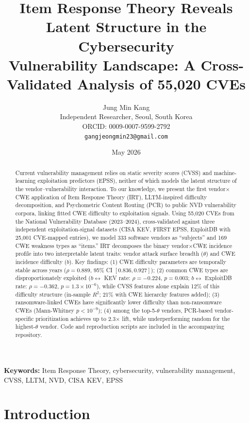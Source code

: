 \documentclass[11pt,a4paper]{article}
\title{Item Response Theory Reveals Latent Structure in the Cybersecurity\\Vulnerability Landscape: A Cross-Validated Analysis of 55,020 CVEs}
\author{Jung Min Kang\\
Independent Researcher, Seoul, South Korea\\
ORCID: 0009-0007-9599-2792\\
\texttt{gangjeongmin23@gmail.com}}
\date{May 2026}
\begin{document}
\sloppy
\maketitle

\begin{abstract}
\noindent
Current vulnerability management relies on static severity scores (CVSS) and machine-learning exploitation predictors (EPSS), neither of which models the latent structure of the vendor--vulnerability interaction.
To our knowledge, we present the first vendor$\times$CWE application of Item Response Theory (IRT), LLTM-inspired difficulty decomposition, and Psychometric Content Routing (PCR) to public NVD vulnerability corpora, linking fitted CWE difficulty to exploitation signals.
Using 55,020 CVEs from the National Vulnerability Database (2023--2024), cross-validated against three independent exploitation-signal datasets (CISA KEV, FIRST EPSS, ExploitDB with 25,001 CVE-mapped entries), we model 333 software vendors as ``subjects'' and 169 CWE weakness types as ``items.''
IRT decomposes the binary vendor$\times$CWE incidence profile into two interpretable latent traits: vendor attack surface breadth ($\theta$) and CWE incidence difficulty ($b$).
Key findings: (1) CWE difficulty parameters are temporally stable across years ($\rho = 0.889$, 95\% CI $[0.836, 0.927]$); (2) common CWE types are disproportionately exploited ($b \leftrightarrow$ KEV rate: $\rho = -0.224$, $p = 0.003$; $b \leftrightarrow$ ExploitDB rate: $\rho = -0.362$, $p = 1.3 \times 10^{-6}$), while CVSS features alone explain 12\% of this difficulty structure (in-sample $R^2$; 21\% with CWE hierarchy features added); (3) ransomware-linked CWEs have significantly lower difficulty than non-ransomware CWEs (Mann-Whitney $p < 10^{-9}$); (4) among the top-5-$\theta$ vendors, PCR-based vendor-specific prioritization achieves up to 2.3$\times$ lift, while underperforming random for the highest-$\theta$ vendor.
Code and reproduction scripts are included in the accompanying repository.
\end{abstract}

\noindent\textbf{Keywords:} Item Response Theory, cybersecurity, vulnerability management, CVSS, LLTM, NVD, CISA KEV, EPSS

\section{Introduction}
\end{document}
